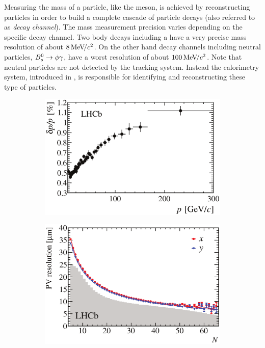 Measuring the mass of a particle, like the \Bs meson, is achieved by reconstructing particles in order to build a
complete cascade of particle decays (also referred to as {\it decay channel}). The mass measurement precision varies depending
on the specific decay channel. Two body \B decays including a \jpsi have a very precise mass resolution of about
$8 {\mathrm{\,Me\kern -0.1em V\!/}c^2}$. On the other hand decay channels including neutral particles, \ie $B^0_s\rightarrow\phi\gamma$, have a worst
resolution of about $100 {\mathrm{\,Me\kern -0.1em V\!/}c^2}$. Note that neutral particles are not detected by the tracking system.
Instead the calorimetry system, introduced in , is responsible for identifying and
reconstructing these type of particles.

\begin{figure}[t]
  \centering
  \begin{subfigure}{0.5\textwidth}
    \raggedright
    \includegraphics[width=\textwidth]{Figures/Chapter2/dppVsp-crop-cmyk}
    \caption{}
    \label{det_deltappvp}
  \end{subfigure}%
  \hfill%
  \begin{subfigure}{0.5\textwidth}
    \raggedleft
    \includegraphics[width=\textwidth]{Figures/Chapter2/DataResXY_1PV_2012-crop-cmyk.pdf}

\end{subfigure}
\end{figure}
